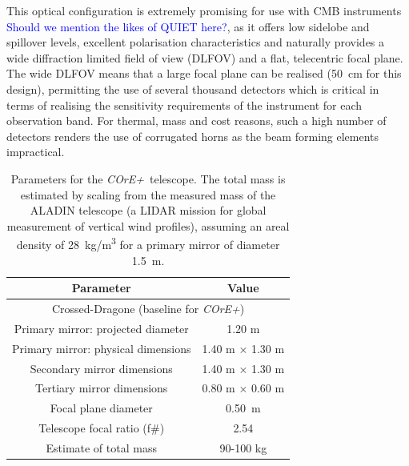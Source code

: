 \documentclass[11pt,a4paper]{article}
\newcommand{\comblue}[1]{\textcolor{blue}{#1}}
\newcommand{\coreplus}{\textit{\negthinspace COrE+\/}}
\begin{document}
This optical configuration is extremely promising for use with CMB instruments \comblue{Should we mention the likes of QUIET here?}, as it offers low sidelobe and spillover levels, excellent polarisation characteristics and naturally provides a wide diffraction limited field of view (DLFOV) and a flat, telecentric focal plane. The wide DLFOV means that a large focal plane can be realised (50~cm for this design), permitting the use of several thousand detectors which is critical in terms of realising the sensitivity requirements of the instrument for each observation band. For thermal, mass and cost reasons, such a high number of detectors renders the use of corrugated horns as the beam forming elements impractical. 
\begin{table}
	\setlength{\belowcaptionskip}{-20pt}
	\begin{center}
		\begin{tabular}{@{\extracolsep{\fill}}c|c} 
			\toprule 
			\textbf{Parameter} & \textbf{Value } \\ \midrule
			\multicolumn{2}{c}{Crossed-Dragone (baseline for \coreplus ) } \\ \hline
			Primary mirror: projected diameter & 1.20 m \\
			Primary mirror: physical dimensions & 1.40 m $\times$ 1.30 m \\
			Secondary mirror dimensions & 1.40 m $\times$ 1.30 m \\
			Tertiary mirror dimensions & 0.80 m $\times$ 0.60 m \\
			Focal plane diameter & 0.50~m \\
			Telescope focal ratio (f\#)  & 2.54 \\ 
			Estimate of total mass & 90-100 kg \\  \hline
			\bottomrule
		\end{tabular}
		\caption{Parameters for the \coreplus\ telescope. The total mass is estimated by scaling from the 
			measured mass of the ALADIN telescope (a LIDAR mission for global measurement of vertical wind profiles), assuming an areal density of 28~kg/m\textsuperscript{3} for a primary mirror of diameter 1.5~m.}
		\label{tab:telparameters}
	\end{center}  
\end{table}
\end{document}
